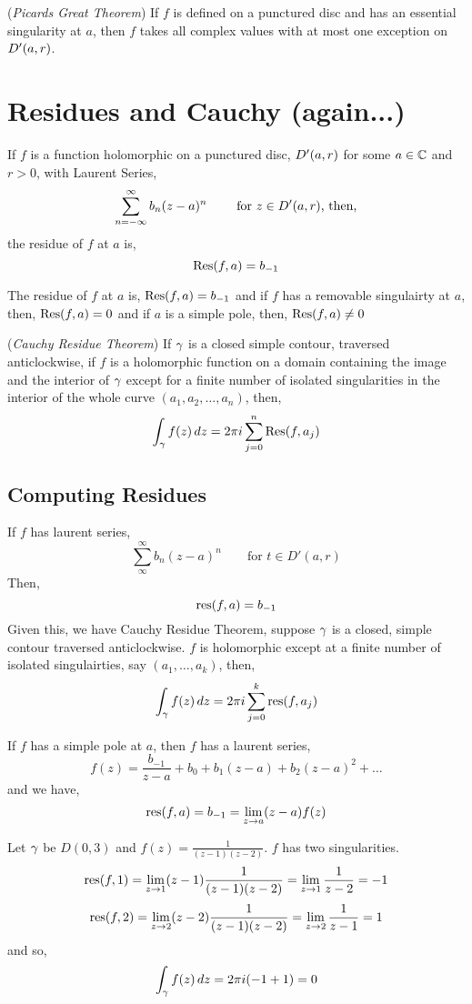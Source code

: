 \documentclass{article}
\begin{document}
\begin{nthm}{(\textit{Picards Great Theorem})}
  If $f$ is defined on a punctured disc and has an essential singularity at $a$, then $f$ takes all complex values with at most one exception on $D'(a, r)$.
\end{nthm}

\section{Residues and Cauchy (again...)}
If $f$ is a function holomorphic on a punctured disc, $D'(a, r)$ for some $a\in\mathbb{C}$ and $r >0$, with Laurent Series,
$$ \sum_{n = -\infty}^{\infty} b_n(z - a)^n \qquad\text{ for $z\in D'(a, r)$, then,} $$
the residue of $f$ at $a$ is,
$$ \operatorname{Res}(f, a) = b_{-1} $$

The residue of $f$ at $a$ is, $\displaystyle{\operatorname{Res}(f, a) = b_{-1}}$ and if $f$ has a removable singulairty at $a$, then, $\displaystyle{\operatorname{Res}(f, a) = 0}$ and if $a$ is a simple pole, then, $\displaystyle{\operatorname{Res}(f, a)\ne 0}$

\begin{nthm}{(\textit{Cauchy Residue Theorem})}
  If $\gamma$ is a closed simple contour, traversed anticlockwise, if $f$ is a holomorphic function on a domain containing the image and the interior of $\gamma$ except for a finite number of isolated singularities in the interior of the whole curve $(a_1, a_2, \dots, a_n)$, then,
  $$ \int_\gamma f(z)\,dz = 2\pi i \sum_{j=0}^n \operatorname{Res}(f, a_j) $$
\end{nthm}

\subsection{Computing Residues}

If $f$ has laurent series,
$$ \sum_{\infty}^\infty b_n(z - a)^n \qquad \text{for $t \in D'(a, r)$}$$
Then,
$$ \operatorname*{res} (f, a) = b_{-1} $$
Given this, we have Cauchy Residue Theorem, suppose $\gamma$ is a closed, simple contour traversed anticlockwise. $f$ is holomorphic except at a finite number of isolated singulairties, say $(a_1, \dots, a_k)$, then,
$$ \int_\gamma f(z)\,dz = 2\pi i \sum_{j=0}^k \operatorname*{res} (f, a_j) $$

If $f$ has a simple pole at $a$, then $f$ has a laurent series,
$$ f(z) = \frac{b_{-1}}{z - a} + b_0 + b_1(z- a) + b_2(z - a)^2 + \dots $$
and we have,
$$ \operatorname*{res} (f, a) = b_{-1} = \lim_{z \to a} (z - a)f(z) $$
\begin{eg}
  Let $\gamma$ be $D(0, 3)$ and $\displaystyle{f(z) = \frac{1}{(z - 1)(z - 2)}}$. $f$ has two singularities.
  $$ \operatorname*{res}(f, 1) = \lim_{z \to 1} (z - 1)\frac{1}{(z - 1)(z - 2)} = \lim_{z \to 1} \frac{1}{z - 2} = -1 $$
  $$ \operatorname*{res} (f, 2) = \lim_{z \to 2} (z - 2)\frac{1}{(z - 1)(z - 2)} = \lim_{z \to 2} \frac{1}{z - 1} = 1 $$
  and so,
  $$ \int_\gamma f(z)\,dz = 2\pi i (-1 + 1) = 0 $$
\end{eg}
\end{document}
